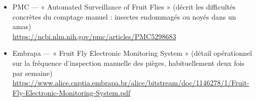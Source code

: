 \documentclass[11pt,a4paper]{article}
\begin{document}
\begin{itemize}[leftmargin=*]
    \item[\cite{surveillance_ff}] PMC --- « Automated Surveillance of Fruit Flies » (décrit les difficultés concrètes du comptage manuel : insectes endommagés ou noyés dans un amas) \\ \url{https://ncbi.nlm.nih.gov/pmc/articles/PMC5298683}
    \item[\cite{embrapa_ff}] Embrapa --- « Fruit Fly Electronic Monitoring System » (détail opérationnel sur la fréquence d'inspection manuelle des pièges, habituellement deux fois par semaine) \\ \url{https://www.alice.cnptia.embrapa.br/alice/bitstream/doc/1146278/1/Fruit-Fly-Electronic-Monitoring-System.pdf}
\end{itemize}
\end{document}
